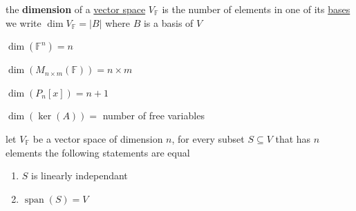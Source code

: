 \documentclass[a4paper,12pt]{article}
\DeclareMathOperator{\spn}{span}
\begin{document}
\begin{definition}
the \textbf{dimension} of a \hyperref[sec:orgea93933]{vector space} \(V_\mathbb{F}\) is the number of elements in one of its \hyperref[sec:orgfcbaa89]{bases}\\
we write \(\dim V_\mathbb{F} = |B|\) where \(B\) is a basis of \(V\)\\

\begin{my_example}
\(\dim(\mathbb{F}^n) = n\)\\
\end{my_example}

\begin{my_example}
\(\dim(M_{n \times m}(\mathbb{F})) = n \times m\)\\
\end{my_example}

\begin{my_example}
\(\dim(P_n[x]) = n + 1\)\\
\end{my_example}

\begin{my_example}
\(\dim(\ker(A)) =\) number of free variables\\
\end{my_example}

\begin{lemma}
let \(V_\mathbb{F}\) be a vector space of dimension \(n\), for every subset \(S \subseteq V\) that has \(n\) elements the following statements are equal\\
\begin{enumerate}
\item \(S\) is linearly independant\\
\item \(\spn(S) = V\)\\
\end{enumerate}


\end{lemma}
\end{definition}
\end{document}
